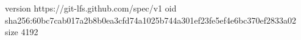 version https://git-lfs.github.com/spec/v1
oid sha256:60bc7cab017a2b8b0ea3cfd74a1025b744a301ef23fe5ef4e6bc370ef2833a02
size 4192
